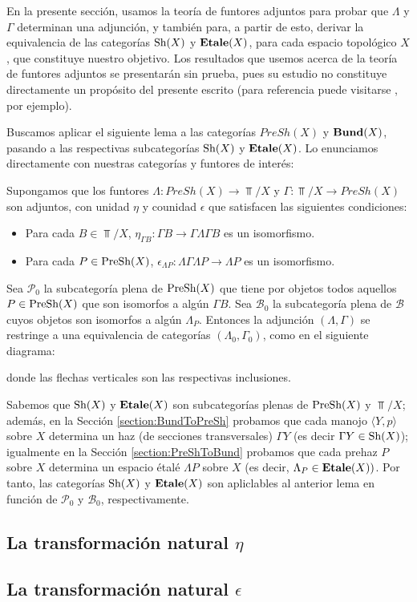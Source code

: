 En la presente sección, usamos la teoría de funtores adjuntos para probar que $\Lambda$ y $\Gamma$ determinan una adjunción, y también para, a partir de esto, derivar la equivalencia de las categorías $\normalfont{\text{Sh}}(X)$ y $\normalfont{\textbf{Etale}}(X)$, para cada espacio topológico $X$, que constituye nuestro objetivo. Los resultados que usemos acerca de la teoría de funtores adjuntos se presentarán sin prueba, pues su estudio no constituye directamente un propósito del presente escrito (para referencia puede visitarse \cite[Chapter~4]{CWM}, por ejemplo).

\phantom{O}

Buscamos aplicar el siguiente lema a las categorías $PreSh(X)$ y $\normalfont{\textbf{Bund}}(X)$, pasando a las respectivas subcategorías $\normalfont{\text{Sh}}(X)$ y $\normalfont{\textbf{Etale}}(X)$. Lo enunciamos directamente con nuestras categorías y funtores de interés:

\begin{Lema}\label{Lema:LemaAdjuntos}
   Supongamos que los funtores $\Lambda:PreSh(X)\to\Top/X$ y $\Gamma:\Top/X\to PreSh(X)$ son adjuntos, con unidad $\eta$ y counidad $\epsilon$ que satisfacen las siguientes condiciones:
   \begin{itemize}
      \item Para cada $B\in\Top/X$, $\eta_{\Gamma B}:\Gamma B \to \Gamma \Lambda \Gamma B$ es un isomorfismo.
      \item Para cada $P\in\normalfont{\text{PreSh}}(X)$, $\epsilon_{\Lambda P}: \Lambda \Gamma \Lambda P \to \Lambda P$ es un isomorfismo.
   \end{itemize}
   Sea $\mathcal{P}_{0}$ la subcategoría plena de $\normalfont{\text{PreSh}}(X)$ que tiene por objetos todos aquellos $P\in\normalfont{\text{PreSh}}(X)$ que son isomorfos a algún $\Gamma B$. Sea $\mathcal{B}_{0}$ la subcategoría plena de $\mathcal{B}$ cuyos objetos son isomorfos a algún $\Lambda_P$. Entonces la adjunción $(\Lambda, \Gamma)$ se restringe a una equivalencia de categorías $(\Lambda_{0}, \Gamma_{0})$, como en el siguiente diagrama:
   
   donde las flechas verticales son las respectivas inclusiones.
\end{Lema}

Sabemos que $\normalfont{\text{Sh}}(X)$ y $\normalfont{\textbf{Etale}}(X)$ son subcategorías plenas de $\normalfont{\text{PreSh}}(X)$ y $\Top/X$; además, en la Sección \ref{section:BundToPreSh} probamos que cada manojo $\langle Y,p\rangle$ sobre $X$ determina un haz (de secciones transversales) $\Gamma Y$ (es decir $\Gamma Y\in \normalfont{\text{Sh}}(X)$); igualmente en la Sección \ref{section:PreShToBund} probamos que cada prehaz $P$ sobre $X$ determina un espacio étalé $\Lambda P$ sobre $X$ (es decir, $\Lambda_P\in\normalfont{\textbf{Etale}}(X))$. Por tanto, las categorías $\normalfont{\text{Sh}}(X)$ y $\normalfont{\textbf{Etale}}(X)$ son apliclables al anterior lema en función de $\mathcal{P}_0$ y $\mathcal{B}_0$, respectivamente.
\subsection{La transformación natural $\eta$}
   
\subsection{La transformación natural $\epsilon$}
   
